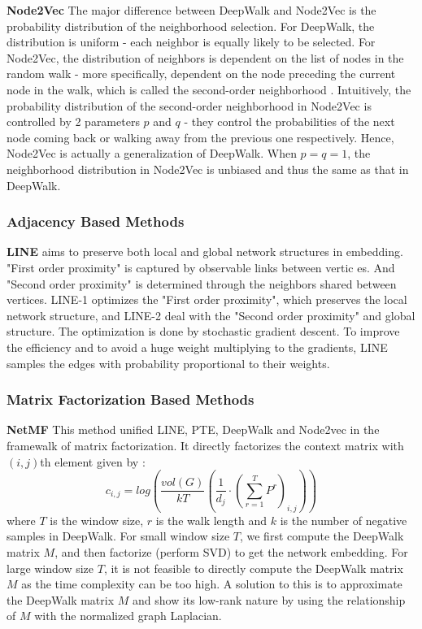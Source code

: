 \documentclass[a4paper]{article}
\begin{document}
\noindent \textbf{Node2Vec} The major difference between DeepWalk and Node2Vec is the probability distribution of the neighborhood selection. For DeepWalk, the distribution is uniform - each neighbor is equally likely to be selected. For Node2Vec, the distribution of neighbors is dependent on the list of nodes in the random walk - more specifically, dependent on the node preceding the current node in the walk, which is called the second-order neighborhood \cite{f}. Intuitively, the probability distribution of the second-order neighborhood in Node2Vec is controlled by 2 parameters $p$ and $q$ - they control the probabilities of the next node coming back or walking away from the previous one respectively. Hence, Node2Vec is actually a generalization of DeepWalk. When $p = q = 1$, the neighborhood distribution in Node2Vec is unbiased and thus the same as that in DeepWalk.

\subsubsection{Adjacency Based Methods} %

\noindent \textbf{LINE} \cite{d} aims to preserve both local and global network structures in embedding. "First order proximity" is captured by observable links between vertic es. And "Second order proximity" is determined through the neighbors shared between vertices. LINE-1 optimizes the "First order proximity", which preserves the local network structure, and LINE-2 deal with the "Second order proximity" and global structure. The optimization is done by stochastic gradient descent. To improve the efficiency and to avoid a huge weight multiplying to the gradients, LINE samples the edges with probability proportional to their weights.


\subsubsection{Matrix Factorization Based Methods} %


\noindent \textbf{NetMF} This method unified LINE, PTE, DeepWalk and Node2vec in the framewalk of matrix factorization. It directly factorizes the context matrix with $(i,j)$th element given by \cite{e}:
$$
c_{i,j} = log(\frac{vol(G)}{kT}(\frac{1}{d_j} \cdot (\sum\limits_{r=1}^T P^r)_{i,j}))
$$
\noindent where $T$ is the window size, $r$ is the walk length and $k$ is the number of negative samples in DeepWalk. For small window size $T$, we first compute the DeepWalk matrix $M$, and then factorize (perform SVD) to get the network embedding. For large window size $T$, it is not feasible to directly compute the DeepWalk matrix $M$ as the time complexity can be too high. A solution to this is to approximate the DeepWalk matrix $M$ and show its low-rank nature by using the relationship of  $M$ with the normalized graph Laplacian.
\end{document}
